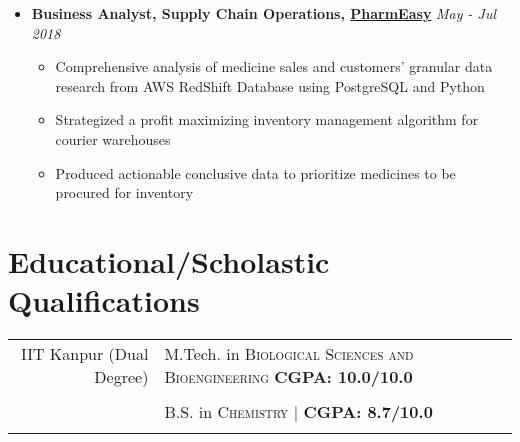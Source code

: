 \documentclass{article}
\begin{document}
\begin{itemize}


\item 
       \textbf{Business Analyst, Supply Chain Operations, \href{https://www.linkedin.com/company/pharmeasy/}{PharmEasy}}
       \hfill\textit{May - Jul 2018}
       \\[0pt]
     

 
    \begin{itemize}
        \item Comprehensive analysis of medicine sales and customers' granular data research from AWS RedShift Database using PostgreSQL and Python
        \item Strategized a profit maximizing inventory management algorithm for courier warehouses
        \item Produced actionable conclusive data to prioritize medicines to be procured for inventory
        \vspace{-1mm}
    \end{itemize}



\end{itemize}

\section*{Educational/Scholastic Qualifications}
% 


\centering
\begin{tabular}{rl}	



 IIT Kanpur (Dual Degree) & M.Tech. in \textsc{Biological Sciences and Bioengineering}
\normalsize \textbf{CGPA: 10.0/10.0} \\&\\ 

& B.S. in \textsc{Chemistry} | \normalsize \textbf{CGPA: 8.7/10.0} \\



\vspace{-1.5mm}

\end{tabular}
\end{document}
